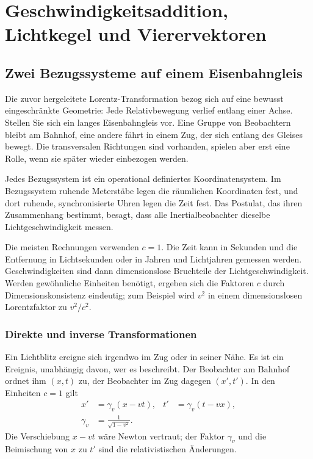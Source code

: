 \chapter{Geschwindigkeitsaddition, Lichtkegel und Vierervektoren}

\section{Zwei Bezugssysteme auf einem Eisenbahngleis}

Die zuvor hergeleitete Lorentz-Transformation bezog sich auf eine bewusst eingeschränkte Geometrie: Jede Relativbewegung verlief entlang einer Achse. Stellen Sie sich ein langes Eisenbahngleis vor. Eine Gruppe von Beobachtern bleibt am Bahnhof, eine andere fährt in einem Zug, der sich entlang des Gleises bewegt. Die transversalen Richtungen sind vorhanden, spielen aber erst eine Rolle, wenn sie später wieder einbezogen werden.

Jedes Bezugssystem ist ein operational definiertes Koordinatensystem. Im Bezugssystem ruhende Meterstäbe legen die räumlichen Koordinaten fest, und dort ruhende, synchronisierte Uhren legen die Zeit fest. Das Postulat, das ihren Zusammenhang bestimmt, besagt, dass alle Inertialbeobachter dieselbe Lichtgeschwindigkeit messen.

Die meisten Rechnungen verwenden \(c=1\). Die Zeit kann in Sekunden und die Entfernung in Lichtsekunden oder in Jahren und Lichtjahren gemessen werden. Geschwindigkeiten sind dann dimensionslose Bruchteile der Lichtgeschwindigkeit. Werden gewöhnliche Einheiten benötigt, ergeben sich die Faktoren \(c\) durch Dimensionskonsistenz eindeutig; zum Beispiel wird \(v^2\) in einem dimensionslosen Lorentzfaktor zu \(v^2/c^2\).

\subsection{Direkte und inverse Transformationen}

Ein Lichtblitz ereigne sich irgendwo im Zug oder in seiner Nähe. Es ist ein Ereignis, unabhängig davon, wer es beschreibt. Der Beobachter am Bahnhof ordnet ihm \((x,t)\) zu, der Beobachter im Zug dagegen \((x',t')\). In den Einheiten \(c=1\) gilt
\begin{align}
x'&=\gamma_v(x-vt),&
t'&=\gamma_v(t-vx),
\label{eq:sr2-direct}\\
\gamma_v&=\frac{1}{\sqrt{1-v^2}}.
\end{align}
Die Verschiebung \(x-vt\) wäre Newton vertraut; der Faktor \(\gamma_v\) und die Beimischung von \(x\) zu \(t'\) sind die relativistischen Änderungen.

